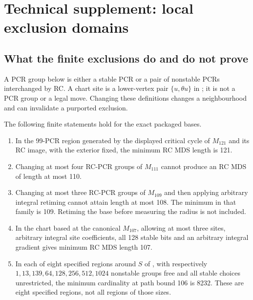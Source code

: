 \section{Technical supplement: local exclusion domains}

\subsection{What the finite exclusions do and do not prove}
\label{sec:scoped-exclusions}
A PCR group below is either a stable PCR or a pair of nonstable
PCRs interchanged by RC. A chart site is a lower-vertex pair
$\{u,\theta u\}$ in ; it is not a PCR
group or a legal move. Changing these definitions changes a
neighbourhood and can invalidate a purported exclusion.

\begin{proposition}
\label{prop:local-exclusions}
The following finite statements hold for the exact packaged bases.
\begin{enumerate}
\item In the 99-PCR region generated by the displayed critical
cycle of $M_{121}$ and its RC image, with the exterior fixed,
the minimum RC MDS length is 121.
\item Changing at most four RC-PCR groups of $M_{111}$ cannot
produce an RC MDS of length at most 110.
\item Changing at most three RC-PCR groups of $M_{109}$ and
then applying arbitrary integral retiming cannot attain length
at most 108. The minimum in that family is 109. Retiming the
base before measuring the radius is not included.
\item In the chart based at the canonical $M_{107}$, allowing
at most three sites, arbitrary integral site coefficients, all
128 stable bits and an arbitrary integral gradient gives minimum
RC MDS length 107.
\item In each of eight specified regions around $S$ of
, with respectively $1,13,139,64,128,256,512,1024$
nonstable groups free and all stable choices unrestricted, the
minimum cardinality at path bound 106 is 8232. These are eight
specified regions, not all regions of those sizes.
\end{enumerate}
\end{proposition}
